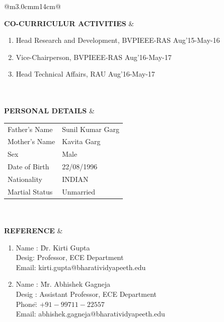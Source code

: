 \documentclass[a4paper]{article}
\begin{document}
\begin{longtable}{@{}m{3.0cm}m{14cm}@{}}
			
			\textrm{\textbf {CO-CURRICULUR ACTIVITIES}} & 
				\begin{enumerate}
					\itemsep -2pt
					\item
					Head Research and Development, BVPIEEE-RAS \hfill Aug'15-May-16
					\item
					Vice-Chairperson, BVPIEEE-RAS \hfill Aug'16-May-17
					\item
					Head Technical Affairs, RAU \hfill Aug'16-May-17
				\end{enumerate}
			\\ \\
			
			\textrm{\textbf {PERSONAL DETAILS}} & 
				\begin{center}
					\begin{tabular}{ m{4cm}m{4cm}}
						Father's Name & Sunil Kumar Garg \\
						Mother's Name & Kavita Garg \\
						Sex & Male \\
						Date of Birth & 22/08/1996 \\
						Nationality & INDIAN \\
						Martial Status & Unmarried \\
  					\end{tabular}
				\end{center}
			\\ \\
			
			\textrm{\textbf {REFERENCE}} & 
				\begin{enumerate}
					\itemsep -2pt
					\item
					\begin{tabbing}
						Name : \=Dr. Kirti Gupta\\ 
						Desig: \>Professor, ECE Department\\
						Email: \>kirti.gupta@bharatividyapeeth.edu\\
					\end{tabbing}
					\item
					\begin{tabbing}
						Name : \=Mr. Abhishek Gagneja\\ 
						Desig : \>Assistant Professor, ECE Department\\
						Phone:\= $ +91-99711-22557$ \\ 
						Email: \>abhishek.gagneja@bharatividyapeeth.edu\\
					\end{tabbing}
				\end{enumerate}
			\\ \\
			

\end{longtable}
\end{document}
